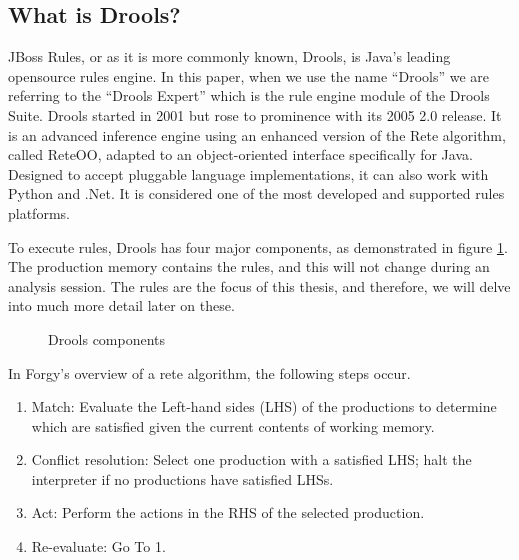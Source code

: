 \subsection{What is Drools?}\label{section:WhatIsDrools}

JBoss Rules, or as it is more commonly known, Drools, is Java's leading opensource rules engine.
In this paper, when we use the name ``Drools'' we are referring to the ``Drools Expert'' which is the rule engine module of the Drools Suite.
Drools started in 2001 but rose to prominence with its 2005 2.0 release.
It is an advanced inference engine using an enhanced version of the Rete algorithm, called Rete\-OO\cite{sottara2010configurable}, adapted to an object-oriented interface specifically for Java.
Designed to accept pluggable language implementations, it can also work with Python and .Net.
It is considered one of the most developed and supported rules platforms.

To execute rules, Drools has four major components, as demonstrated in figure \ref{fig:Drools_components}.
The production memory contains the rules, and this will not change during an analysis session.
The rules are the focus of this thesis, and therefore, we will delve into much more detail later on these.

\begin{figure}[h]
    \centering
    \caption{Drools components}
    \label{fig:Drools_components}
\end{figure}

In Forgy's\cite{forgy1989rete} overview of a rete algorithm, the following steps occur.
\begin{enumerate}
    \setlength\itemsep{0em}
    \item Match: Evaluate the Left-hand sides (LHS) of the productions to determine which are satisfied given the current contents of working memory.
    \item Conflict resolution: Select one production with a satisfied LHS; halt the interpreter if no productions have satisfied LHSs.
    \item Act: Perform the actions in the RHS of the selected production.
    \item Re-evaluate: Go To 1.
\end{enumerate}

